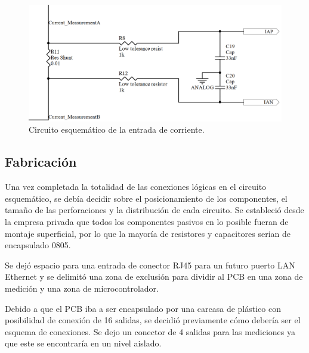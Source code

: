 \begin{figure}[!htb]
	\centering
	\includegraphics[width=120mm,keepaspectratio]{Figures/medicioncorriente.png}
	\caption{Circuito esquemático de la entrada de corriente.}
	\label{fig:medcurrent}
\end{figure}

\subsection{Fabricación}

Una vez completada la totalidad de las conexiones lógicas en el circuito esquemático, se debía decidir sobre el posicionamiento de los componentes, el tamaño de las perforaciones y la distribución de cada circuito. Se estableció desde la empresa privada que todos los componentes pasivos en lo posible fueran de montaje superficial, por lo que la mayoría de resistores y capacitores serian de encapsulado 0805. 



Se dejó espacio para una entrada de conector RJ45 para un futuro puerto LAN Ethernet y se delimitó una zona de exclusión para dividir al PCB en una zona de medición y una zona de microcontrolador.

Debido a que el PCB iba a ser encapsulado por una carcasa de plástico con posibilidad de conexión de 16 salidas, se decidió previamente cómo debería ser el esquema de conexiones. Se dejo un conector de 4 salidas para las mediciones ya que este se encontraría en un nivel aislado.

